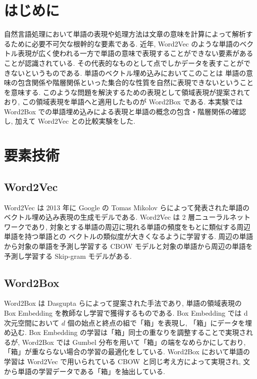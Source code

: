 \documentclass[twocolumn]{jarticle}     %
\begin{document}

\section{はじめに}
自然言語処理において単語の表現や処理方法は文章の意味を計算によって解析するために必要不可欠な根幹的な要素である.
近年, Word2Vec のような単語のベクトル表現が広く使われる一方で単語の意味で表現することができない要素があることが認識されている. 
その代表的なものとして点でしかデータを表すことができないというものである. 単語のベクトル埋め込みにおいてこのことは
単語の意味の包含関係や階層関係といった集合的な性質を自然に表現できないということを意味する. このような問題を解決するための表現として領域表現が提案されており, 
この領域表現を単語へと適用したものが Word2Box である. 本実験では Word2Box での単語埋め込みによる表現と単語の概念の包含・階層関係の確認し, 
加えて Word2Vec との比較実験をした.

\section{要素技術}
\subsection{Word2Vec}
Word2Vec は 2013 年に Google の Tomas Mikolov らによって発表された単語のベクトル埋め込み表現の生成モデルである. 
Word2Vec は 2 層ニューラルネットワークであり, 対象とする単語の周辺に現れる単語の頻度をもとに類似する周辺単語を持つ単語との
ベクトルの類似度が大きくなるように学習する. 周辺の単語から対象の単語を予測し学習する CBOW モデルと対象の単語から周辺の単語を予測し学習する Skip-gram モデルがある.

\subsection{Word2Box}
Word2Box は Dasgupta らによって提案された手法であり, 単語の領域表現の Box Embedding を教師なし学習で獲得するものである. 
Box Embedding では d 次元空間において $d$ 個の始点と終点の組で「箱」を表現し, 「箱」にデータを埋め込む.
Box Embedding の学習は「箱」同士の重なりを調整することで実現されるが, Word2Box では Gumbel 分布を用いて「箱」の端をなめらかにしており, 
「箱」が重ならない場合の学習の最適化をしている. 
Word2Box において単語の学習は Word2Vec で用いられている CBOW と同じ考え方によって実現され, 文から単語の学習データである「箱」を抽出している.
\end{document}
